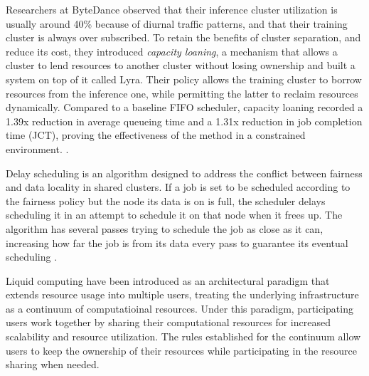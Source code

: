 Researchers at ByteDance observed that their inference cluster utilization is
usually around 40\% because of diurnal traffic patterns, and that their
training cluster is always over subscribed. To retain the benefits of cluster
separation, and reduce its cost, they introduced \textit{capacity loaning}, a
mechanism that allows a cluster to lend resources to another cluster without
losing ownership and built a system on top of it called Lyra. Their policy
allows the training cluster to borrow resources from the inference one, while
permitting the latter to reclaim resources dynamically. Compared to a baseline
FIFO scheduler, capacity loaning recorded a 1.39x reduction in average queueing
time and a 1.31x reduction in job completion time (JCT), proving the
effectiveness of the method in a constrained environment. \cite{li_lyra_2023}.

Delay scheduling is an algorithm designed to address the conflict between
fairness and data locality in shared clusters. If a job is set to be scheduled
according to the fairness policy but the node its data is on is full, the
scheduler delays scheduling it in an attempt to schedule it on that node when
it frees up. The algorithm has several passes trying to schedule the job as
close as it can, increasing how far the job is from its data every pass to
guarantee its eventual scheduling \cite{zaharia_delay_2010}.

Liquid computing have been introduced as an architectural paradigm that extends
resource usage into multiple users, treating the underlying infrastructure as a
continuum of computatioinal resources. Under this paradigm, participating users
work together by sharing their computational resources for increased
scalability and resource utilization. The rules established for the continuum
allow users to keep the ownership of their resources while participating in the
resource sharing when needed.

